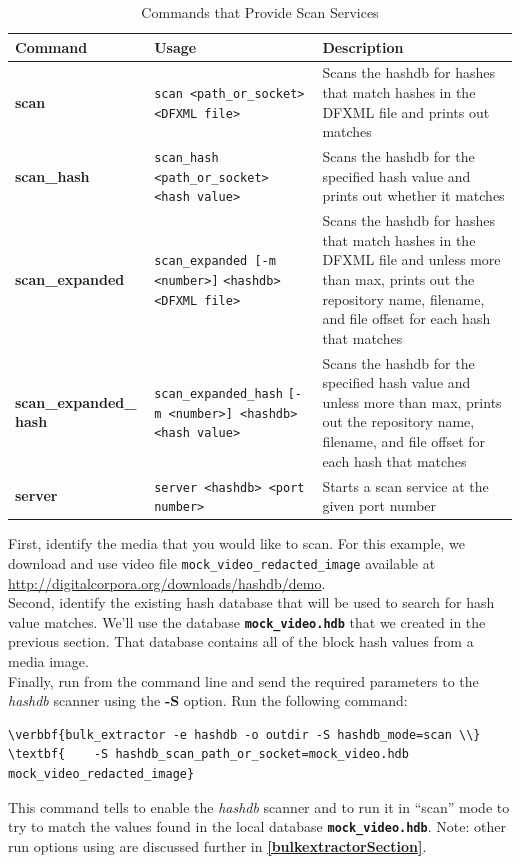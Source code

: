 \documentclass[11pt,fleqn]{article} %
\begin{document}
\begin{table}[!ht]
\centering
\caption{Commands that Provide Scan Services}
\label{tab:scanServices}
\begin{tabular}{|p{3.5 cm}|p{6 cm}|p{4 cm}|}
\hline \hline
\textbf{Command} & \textbf{Usage} & \textbf{Description} \\
\hline
\textbf{scan} & \verb+scan <path_or_socket>+ \verb+<DFXML file>+ & Scans the hashdb for hashes that match hashes in the DFXML file and prints out matches\\
\hline
\textbf{scan\_hash} & \verb+scan_hash <path_or_socket>+ \verb+<hash value>+ & Scans the hashdb for the specified hash value and prints out whether it matches\\
\hline
\textbf{scan\_expanded} & \verb+scan_expanded [-m <number>]+ \verb+<hashdb> <DFXML file>+ & Scans the hashdb for hashes that match hashes in the DFXML file and unless more than max, prints out the repository name, filename, and file offset for each hash that matches\\
\hline
\textbf{scan\_expanded\_} \textbf{hash} & \verb+scan_expanded_hash+ \verb+[-m <number>] <hashdb>+ \verb+<hash value>+ & Scans the hashdb for the specified hash value and unless more than max, prints out the repository name, filename, and file offset for each hash that matches\\
\hline
\textbf{server} &  \verb+server <hashdb> <port number>+ & Starts a scan service at the given port number\\
\hline
\end{tabular}
\end{table}

First, identify the media that you would like to scan. For this example, we download and use video file \texttt{mock\_video\_redacted\_image} available at \url{http://digitalcorpora.org/downloads/hashdb/demo}.\\ 

Second, identify the existing hash database that will be used to search for hash value matches. We'll use the database \texttt{\textbf{mock\_video.hdb}} that we created in the previous section. That database contains all of the block hash values from a media image. \\

Finally, run \bulk from the command line and send the required parameters to the \textit{hashdb} scanner using the \textbf{-S} option. Run the following command: 
\begin{Verbatim}[commandchars=\\\{\}]
\verbbf{bulk_extractor -e hashdb -o outdir -S hashdb_mode=scan \\}
\textbf{    -S hashdb_scan_path_or_socket=mock_video.hdb mock_video_redacted_image}
\end{Verbatim}
This command tells \bulk to enable the \textit{hashdb} scanner and to run it in ``scan'' mode to try to match the values found in the local database \texttt{\textbf{mock\_video.hdb}}. Note: other run options using \bulk are discussed further in \textbf{\autoref{bulkextractorSection}}.\\
\end{document}
